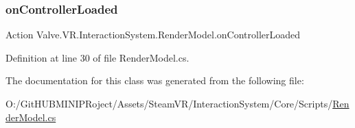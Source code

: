 \subsubsection{\texorpdfstring{onControllerLoaded}{onControllerLoaded}}
{\footnotesize\ttfamily Action Valve.\+V\+R.\+Interaction\+System.\+Render\+Model.\+on\+Controller\+Loaded}



Definition at line 30 of file Render\+Model.\+cs.



The documentation for this class was generated from the following file\+:\begin{DoxyCompactItemize}
\item 
O\+:/\+Git\+H\+U\+B\+M\+I\+N\+I\+P\+Roject/\+Assets/\+Steam\+V\+R/\+Interaction\+System/\+Core/\+Scripts/\mbox{\hyperlink{_render_model_8cs}{Render\+Model.\+cs}}\end{DoxyCompactItemize}
